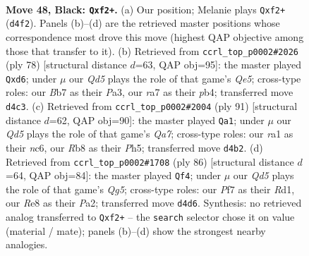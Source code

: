 \documentclass[11pt]{article}
\begin{document}
\clearpage

\begin{figure}[p]\centering
\begin{subfigure}{0.46\textwidth}\centering
\resizebox{\linewidth}{!}{%
\newchessgame
\chessboard[
  setfen={1r2r3/Rb3p1k/1p4p1/8/3q3P/1P6/2PN1Q2/R2B2K1 b - - 1 48},
  showmover=false,
  pgfstyle=straightmove, color=movearrow, markmove={d4-f2}
]}
\caption{}
\end{subfigure}\hfill
\begin{subfigure}{0.46\textwidth}\centering
\resizebox{\linewidth}{!}{%
\newchessgame
\chessboard[
  setfen={1r3r1k/6qp/3n3p/4Q3/1p6/P5P1/5PK1/2RR4 w - - 0 40},
  showmover=false,
  pgfstyle=straightmove, color=movearrow, markmove={e5-d6}
]}
\caption{}
\end{subfigure}
\\[4pt]
\begin{subfigure}{0.46\textwidth}\centering
\resizebox{\linewidth}{!}{%
\newchessgame
\chessboard[
  setfen={5rk1/5p2/2N1p3/p5pp/P1R2b2/1P6/q1Q1K1B1/8 b - - 7 46},
  showmover=false,
  pgfstyle=straightmove, color=movearrow, markmove={a2-a1}
]}
\caption{}
\end{subfigure}\hfill
\begin{subfigure}{0.46\textwidth}\centering
\resizebox{\linewidth}{!}{%
\newchessgame
\chessboard[
  setfen={3k4/1b1nq3/1pr3p1/pN4Q1/8/1P6/P1P4P/1K1R4 w - - 25 44},
  showmover=false,
  pgfstyle=straightmove, color=movearrow, markmove={g5-f4}
]}
\caption{}
\end{subfigure}
\caption{\textbf{Move 48, Black: \texttt{Qxf2+}.} (a) Our position; Melanie plays \texttt{Qxf2+} (\texttt{d4f2}). Panels (b)--(d) are the retrieved master positions whose correspondence most drove this move (highest QAP objective among those that transfer to it). (b) Retrieved from \texttt{ccrl\_top\_p0002\#2026} (ply 78) [structural distance $d$=63, QAP obj=95]: the master played \texttt{Qxd6}; under $\mu$ our \emph{Qd5} plays the role of that game's \emph{Qe5}; cross-type roles: our \emph{B}b7 as their \emph{P}a3, our \emph{r}a7 as their \emph{p}b4; transferred move \texttt{d4c3}. (c) Retrieved from \texttt{ccrl\_top\_p0002\#2004} (ply 91) [structural distance $d$=62, QAP obj=90]: the master played \texttt{Qa1}; under $\mu$ our \emph{Qd5} plays the role of that game's \emph{Qa7}; cross-type roles: our \emph{r}a1 as their \emph{n}c6, our \emph{R}b8 as their \emph{P}h5; transferred move \texttt{d4b2}. (d) Retrieved from \texttt{ccrl\_top\_p0002\#1708} (ply 86) [structural distance $d$=64, QAP obj=84]: the master played \texttt{Qf4}; under $\mu$ our \emph{Qd5} plays the role of that game's \emph{Qg5}; cross-type roles: our \emph{P}f7 as their \emph{R}d1, our \emph{R}e8 as their \emph{P}a2; transferred move \texttt{d4d6}. Synthesis: no retrieved analog transferred to \texttt{Qxf2+} -- the \texttt{search} selector chose it on value (material / mate); panels (b)--(d) show the strongest nearby analogies.}
\label{fig:thought-m95}
\end{figure}
\end{document}

